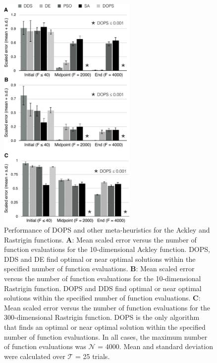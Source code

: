 \documentclass[12pt]{article}
\begin{document}
\begin{figure}[ht]
\centering
\includegraphics[width=0.60\textwidth]{./figs/Figure_2_TestFunctions-crop.pdf}
\caption{Performance of DOPS and other meta-heuristics for the Ackley and Rastrigin functions.
\textbf{A}: Mean scaled error versus the number of function evaluations for the 10-dimensional Ackley function. DOPS, DDS and DE find optimal or near optimal solutions within the specified number of function evaluations.
\textbf{B}: Mean scaled error versus the number of function evaluations for the 10-dimensional Rastrigin function. DOPS and DDS find optimal or near optimal solutions within the specified number of function evaluations.
\textbf{C}: Mean scaled error versus the number of function evaluations for the 300-dimensional Rastrigin function. DOPS is the only algorithm that finds an optimal or near optimal solution within the specified number of function evaluations. In all cases, the maximum number of function evaluations was $\mathcal{N}$ = 4000. Mean and standard deviation were calculated over $\mathcal{T}$ = 25 trials. }\label{fig-testfunctions}
\end{figure}

\clearpage
\end{document}
